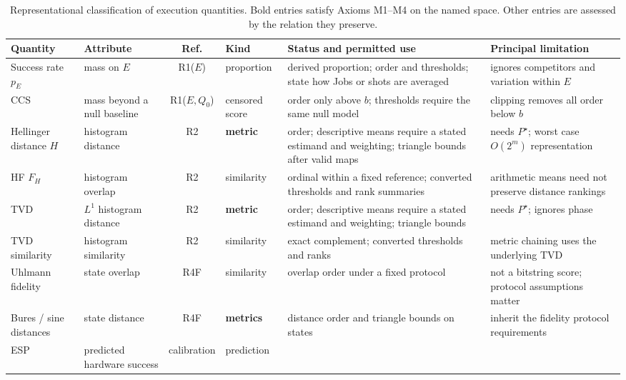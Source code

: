 \documentclass[10pt,conference]{IEEEtran}
\newcommand{\HF}{F_{H}}
\begin{document}
\begin{table}[ht]
\centering
\caption{Representational classification of execution quantities. Bold entries satisfy Axioms M1--M4 on the named space. Other entries are assessed by the relation they preserve.}
\label{tab:audit}
\scriptsize
\renewcommand{\arraystretch}{1.12}
\begin{tabularx}{\textwidth}{@{}>{\raggedright\arraybackslash}p{}
>{\raggedright\arraybackslash}p{} c
>{\raggedright\arraybackslash}p{}
>{\raggedright\arraybackslash}p{}
>{\raggedright\arraybackslash}X@{}}
\toprule
\textbf{Quantity} & \textbf{Attribute} & \textbf{Ref.} & \textbf{Kind}
& \textbf{Status and permitted use} & \textbf{Principal limitation} \\
\midrule
Success rate $p_{E}$ & mass on $E$ & R1($E$) & proportion
& derived proportion; order and thresholds; state how Jobs or shots are averaged
& ignores competitors and variation within $E$ \\
CCS & mass beyond a null baseline & R1($E,Q_0$) & censored score
& order only above $b$; thresholds require the same null model
& clipping removes all order below $b$ \\
Hellinger distance $H$ & histogram distance & R2 & \textbf{metric}
& order; descriptive means require a stated estimand and weighting; triangle bounds after valid maps
& needs $P^{\star}$; worst case $O(2^{m})$ representation \\
HF $\HF$ & histogram overlap & R2 & similarity
& ordinal within a fixed reference; converted thresholds and rank summaries
& arithmetic means need not preserve distance rankings \\
TVD & $L^{1}$ histogram distance & R2 & \textbf{metric}
& order; descriptive means require a stated estimand and weighting; triangle bounds
& needs $P^{\star}$; ignores phase \\
TVD similarity & histogram similarity & R2 & similarity
& exact complement; converted thresholds and ranks
& metric chaining uses the underlying TVD \\
Uhlmann fidelity & state overlap & R4F & similarity
& overlap order under a fixed protocol
& not a bitstring score; protocol assumptions matter \\
Bures / sine distances & state distance & R4F & \textbf{metrics}
& distance order and triangle bounds on states
& inherit the fidelity protocol requirements \\
ESP & predicted hardware success & calibration & prediction

\end{tabularx}
\end{table}
\end{document}
